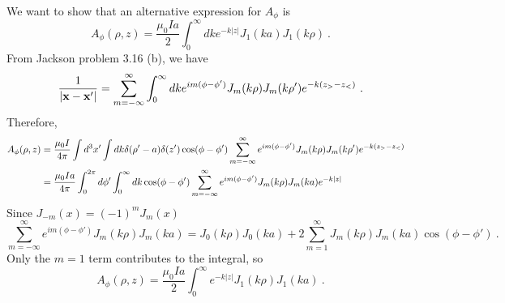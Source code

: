 \documentclass[12pt]{article}
\newcommand{\x}{{\bf x}}
\begin{document}
\newpage
{} We want to show that an alternative expression for $A_\phi$ is
\begin{equation}
    A_\phi(\rho, z) = \frac{\mu_0 I a}{2} \int_0^\infty dk e^{-k|z|} J_1(ka) J_1(k \rho)~.
\end{equation}
From Jackson problem 3.16 (b), we have
\begin{equation}
    \frac{1}{|\x - \x'|} = \sum_{m = - \infty}^\infty \int_0^\infty dk e^{im(\phi - \phi')} J_m(k \rho) J_m(k \rho') e^{-k(z_> - z_<)}~.
\end{equation}
Therefore,
\begin{align}
    A_\phi(\rho,z) &= \frac{\mu_0 I}{4\pi} \int d^3 x'\int dk  \delta(\rho' - a) \delta(z') \cos(\phi - \phi') \sum_{m = -\infty}^\infty e^{im(\phi - \phi')} J_m(k\rho) J_m(k \rho') e^{-k(z_> - z_<)}\cr
    &= \frac{\mu_0 I a}{4\pi} \int_0^{2\pi} d\phi' \int_0^\infty dk \cos(\phi - \phi') \sum_{m = -\infty}^\infty e^{im(\phi - \phi')} J_m(k \rho) J_m(k a) e^{-k|z|}
\end{align}
Since $J_{-m}(x) = (-1)^m J_m(x)$
\begin{equation}
    \sum_{m = -\infty}^\infty e^{im(\phi - \phi')} J_m(k \rho) J_m(k a) = J_0(k \rho) J_0 (ka) + 2 \sum_{m = 1}^\infty J_m(k \rho) J_m(ka) \cos(\phi - \phi')~.
\end{equation}
Only the $m = 1$ term contributes to the integral, so
\begin{equation}
    A_\phi(\rho,z) = \frac{\mu_0 I a}{2} \int_0^\infty e^{-k|z|} J_1(k \rho) J_1(k a)~.
\end{equation}
\end{document}
